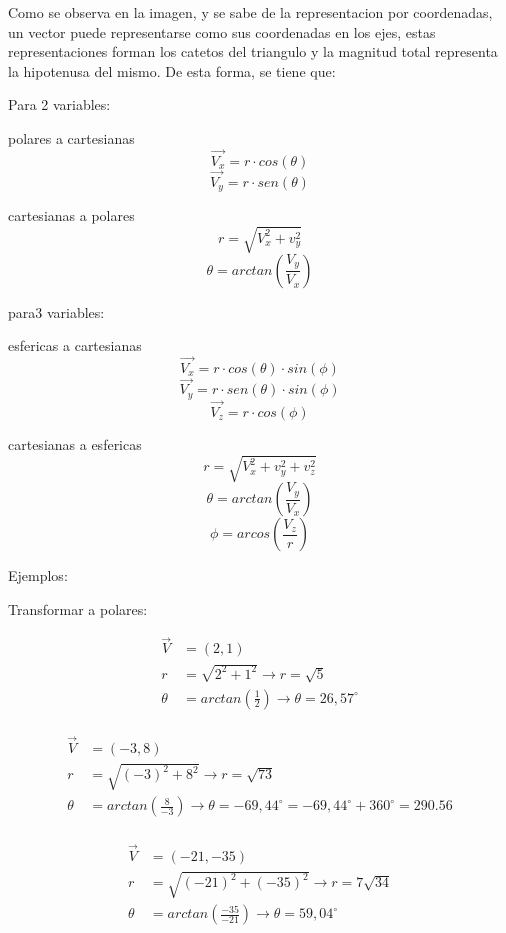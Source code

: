     Como se observa en la imagen, y se sabe de la representacion por
    coordenadas, un vector puede representarse como sus coordenadas en los
    ejes, estas representaciones forman los catetos del triangulo y la magnitud
    total representa la hipotenusa del mismo. De esta forma, se tiene que:

    Para 2 variables:

    polares a cartesianas
    $$\vec{V_x}= r\cdot cos(\theta)$$
    $$\vec{V_y} =  r\cdot sen(\theta)$$

    cartesianas a polares
    $$ r = \sqrt{V_x ^2+v_y^2}$$
    $$\theta= arctan\left(\frac{V_y}{V_x}\right)$$



    para3 variables:

    esfericas a cartesianas
    $$\vec{V_x}= r\cdot cos(\theta) \cdot sin(\phi)$$
    $$\vec{V_y} = r\cdot sen(\theta)\cdot sin(\phi)$$
    $$\vec{V_z}=r\cdot cos(\phi)$$

    cartesianas a esfericas
    $$ r = \sqrt{V_x ^2+v_y^2+v_z^2}$$
    $$\theta= arctan\left(\frac{V_y}{V_x}\right)$$
    $$\phi = arcos\left(\frac{V_z}{r}\right)$$


    Ejemplos:


    Transformar a polares:

     \begin{align*}
         \vec{V}&=(2,1) \\
         r &= \sqrt{2^2+1^2}  \rightarrow r= \sqrt{5} \\
         \theta&= arctan\left(\frac{1}{2}\right)  \rightarrow \theta= 26,57 ^\circ \\
    \end{align*}

     \begin{align*}
         \vec{V}&=(-3,8) \\
         r &= \sqrt{(-3)^2+8^2} \rightarrow r= \sqrt{73} \\
         \theta&= arctan\left(\frac{8}{-3}\right)  \rightarrow \theta= -69,44^\circ =-69,44^\circ+360^\circ=290.56 \\
    \end{align*}

     \begin{align*}
         \vec{V}&=(-21,-35) \\
         r &= \sqrt{(-21)^2+(-35)^2}  \rightarrow r= 7\sqrt{34} \\
         \theta&= arctan\left(\frac{-35}{-21}\right)  \rightarrow \theta= 59,04^\circ\\
    \end{align*}

